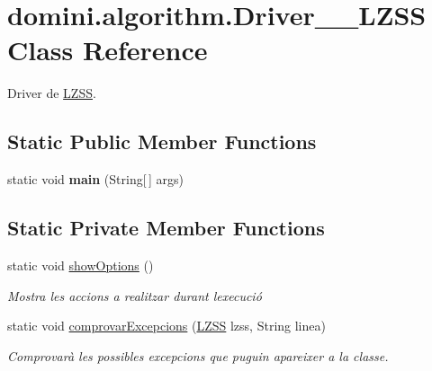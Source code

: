 \hypertarget{classdomini_1_1algorithm_1_1Driver____LZSS}{}\section{domini.\+algorithm.\+Driver\+\_\+\+\_\+\+L\+Z\+SS Class Reference}
\label{classdomini_1_1algorithm_1_1Driver____LZSS}


Driver de \hyperlink{classdomini_1_1algorithm_1_1LZSS}{L\+Z\+SS}.  


\subsection*{Static Public Member Functions}
\begin{DoxyCompactItemize}
\item 
\mbox{\label{classdomini_1_1algorithm_1_1Driver____LZSS_ac1b8e15e184e7372a5ad2a76ac3b5d8c}} 
static void {\bfseries main} (String\mbox{[}$\,$\mbox{]} args)
\end{DoxyCompactItemize}
\subsection*{Static Private Member Functions}
\begin{DoxyCompactItemize}
\item 
\mbox{\label{classdomini_1_1algorithm_1_1Driver____LZSS_a4362a21690fbdb3ef42dd6f8ca0f0da6}} 
static void \hyperlink{classdomini_1_1algorithm_1_1Driver____LZSS_a4362a21690fbdb3ef42dd6f8ca0f0da6}{show\+Options} ()
\begin{DoxyCompactList}\small\item\em Mostra les accions a realitzar durant l\textquotesingle{}execució \end{DoxyCompactList}\item 
static void \hyperlink{classdomini_1_1algorithm_1_1Driver____LZSS_a3b1983c6a71cd4d510e8434cd2e7f8f2}{comprovar\+Excepcions} (\hyperlink{classdomini_1_1algorithm_1_1LZSS}{L\+Z\+SS} lzss, String linea)
\begin{DoxyCompactList}\small\item\em Comprovarà les possibles excepcions que puguin apareixer a la classe. \end{DoxyCompactList}\end{DoxyCompactItemize}


